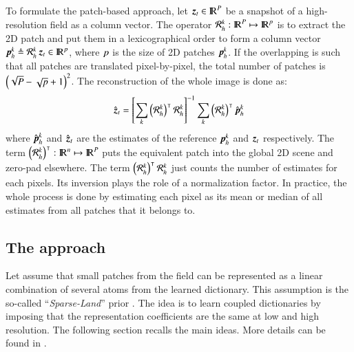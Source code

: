 To formulate the patch-based approach, let $ \operatorname{\boldsymbol{z}}_t \in {\rm I\!R}^{P} $ be a snapshot of a high-resolution field as a column vector. The operator $ \operatorname{\mathit{\mathcal{R}_h^{k}}}:{\rm I\!R}^{P} \mapsto {\rm I\!R}^{p} $ is to extract the 2D patch and put them in a lexicographical order to form a column vector $ \operatorname{\mathit{\operatorname{\boldsymbol{p}}_h^{k}}} \triangleq \operatorname{\mathit{\mathcal{R}_h^{k}}} \operatorname{\boldsymbol{z}}_t \in {\rm I\!R}^p $, where $ p $ is the size of 2D patches $ \operatorname{\mathit{\operatorname{\boldsymbol{p}}_h^{k}}} $. If the overlapping is such that all patches are translated pixel-by-pixel, the total number of patches is $ \left( \sqrt{P} - \sqrt{p} + 1 \right)^2 $. The reconstruction of the whole image is done as:
\begin{equation}
\hat{\operatorname{\boldsymbol{z}}}_t= \left[ \sum\limits_{k} \left(\operatorname{\mathit{\mathcal{R}_h^{k}}}\right)^{\intercal}\operatorname{\mathit{\mathcal{R}_h^{k}}}\right]^{-1}\sum\limits_{k} \left(\operatorname{\mathit{\mathcal{R}_h^{k}}}\right)^{\intercal}\hat{\operatorname{\boldsymbol{p}}}_h^k
\end{equation}
where $ \hat{\operatorname{\boldsymbol{p}}}_h^k $ and $ \hat{\operatorname{\boldsymbol{z}}}_t $ are the estimates of the reference $ \operatorname{\mathit{\operatorname{\boldsymbol{p}}_h^{k}}} $ and $ \operatorname{\boldsymbol{z}}_t $ respectively. The term $ \left(\operatorname{\mathit{\mathcal{R}_h^{k}}}\right)^{\intercal}: {\rm I\!R}^{n} \mapsto {\rm I\!R}^{P}$ puts the equivalent patch into the global 2D scene and zero-pad elsewhere. The term $ \left(\operatorname{\mathit{\mathcal{R}_h^{k}}}\right)^{\intercal}\operatorname{\mathit{\mathcal{R}_h^{k}}} $ just counts the number of estimates for each pixels. Its inversion plays the role of a normalization factor. In practice, the whole process is done by estimating each pixel as its mean or median of all estimates from all patches that it belongs to. 

\subsection{The approach}
\label{sec:chap3_theapproach}
Let assume that small patches from the field can be represented as a linear combination of several atoms from the learned dictionary. This assumption is the so-called ``\textit{Sparse-Land}'' prior \citep{zeyde2012single}. The idea is to learn coupled dictionaries by imposing that the representation coefficients are the same at low and high resolution. The following section recalls the main ideas. More details can be found in \citet{zeyde2012single}.

